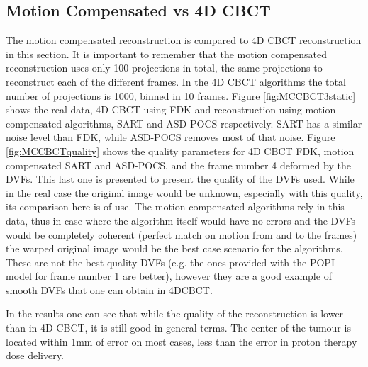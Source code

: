 \subsection{Motion Compensated vs 4D CBCT}

The motion compensated reconstruction is compared to 4D CBCT reconstruction in this section. It is important to remember that the motion compensated reconstruction uses only 100 projections in total, the same projections to reconstruct each of the different frames. In the 4D CBCT algorithms the total number of projections is 1000, binned in 10 frames. Figure \ref{fig:MCCBCT3static} shows the real data, 4D CBCT using FDK and reconstruction using motion compensated algorithms, SART and ASD-POCS respectively. SART has a similar noise level than FDK, while ASD-POCS removes most of that noise. Figure \ref{fig:MCCBCTquality} shows the quality parameters for 4D CBCT FDK, motion compensated SART and ASD-POCS, and the frame number 4 deformed by the DVFs. This last one is presented to present the quality of the DVFs used. While in the real case the original image would be unknown, especially with this quality, its comparison here is of use. The motion compensated algorithms rely in this data, thus in case where the algorithm itself would have no errors and the DVFs would be completely coherent (perfect match on motion from and to the frames) the warped original image would be the best case scenario for the algorithms. These are not the best quality DVFs (e.g. the ones provided with the POPI model for frame number 1 are better), however they are a good example of smooth DVFs that one can obtain in 4DCBCT.

In the results one can see that while the quality of the reconstruction is lower than in 4D-CBCT, it is still good in general terms. The center of the tumour is located within 1mm of error on most cases, less than the error in proton therapy dose delivery. 


